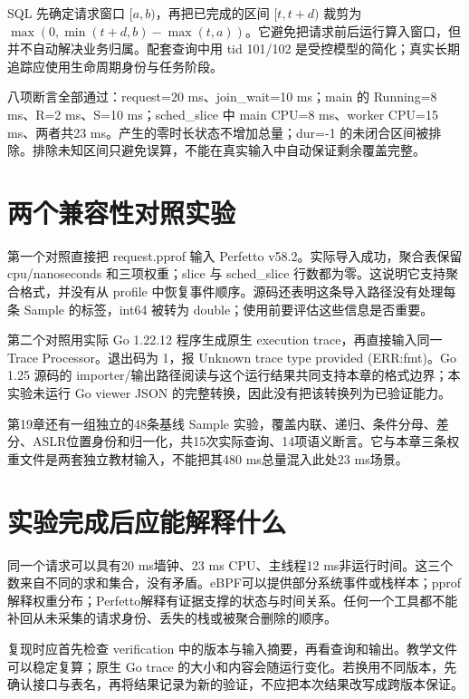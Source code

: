 \documentclass[UTF8,fontset=fandol,openany,11pt]{ctexbook}
\begin{document}
SQL 先确定请求窗口 \([a,b)\)，再把已完成的区间 \([t,t+d)\) 裁剪为 \(\max(0,\min(t+d,b)-\max(t,a))\)。它避免把请求前后运行算入窗口，但并不自动解决业务归属。配套查询中用 tid 101/102 是受控模型的简化；真实长期追踪应使用生命周期身份与任务阶段。


八项断言全部通过：request=20 ms、join\_\allowbreak{}wait=10 ms；main 的 Running=8 ms、R=2 ms、S=10 ms；sched\_\allowbreak{}slice 中 main CPU=8 ms、worker CPU=15 ms、两者共23 ms。产生的零时长状态不增加总量；dur=-1 的未闭合区间被排除。排除未知区间只避免误算，不能在真实输入中自动保证剩余覆盖完整。\cite{pf-request}


\section{两个兼容性对照实验}

第一个对照直接把 request.pprof 输入 Perfetto v58.2。实际导入成功，聚合表保留 cpu/nanoseconds 和三项权重；slice 与 sched\_\allowbreak{}slice 行数都为零。这说明它支持聚合格式，并没有从 profile 中恢复事件顺序。源码还表明这条导入路径没有处理每条 Sample 的标签，int64 被转为 double；使用前要评估这些信息是否重要。\cite{pf-pprof}\cite{pf-validation}


第二个对照用实际 Go 1.22.12 程序生成原生 execution trace，再直接输入同一 Trace Processor。退出码为 1，报 Unknown trace type provided (ERR:fmt)。Go 1.25 源码的 importer/输出路径阅读与这个运行结果共同支持本章的格式边界；本实验未运行 Go viewer JSON 的完整转换，因此没有把该转换列为已验证能力。\cite{pf-go-header}\cite{pf-go-json}\cite{pf-validation}


第19章还有一组独立的48条基线 Sample 实验，覆盖内联、递归、条件分母、差分、ASLR位置身份和归一化，共15次实际查询、14项语义断言。它与本章三条权重文件是两套独立教材输入，不能把其480 ms总量混入此处23 ms场景。\cite{pp-teaching}


\section{实验完成后应能解释什么}

同一个请求可以具有20 ms墙钟、23 ms CPU、主线程12 ms非运行时间。这三个数来自不同的求和集合，没有矛盾。eBPF可以提供部分系统事件或栈样本；pprof解释权重分布；Perfetto解释有证据支撑的状态与时间关系。任何一个工具都不能补回从未采集的请求身份、丢失的栈或被聚合删除的顺序。


复现时应首先检查 verification 中的版本与输入摘要，再看查询和输出。教学文件可以稳定复算；原生 Go trace 的大小和内容会随运行变化。若换用不同版本，先确认接口与表名，再将结果记录为新的验证，不应把本次结果改写成跨版本保证。
\end{document}
